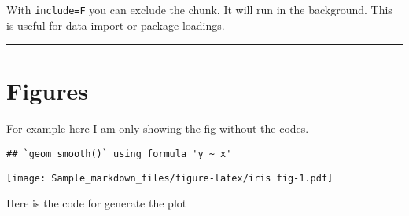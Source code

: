 \documentclass[]{article}
\begin{document}
With \texttt{include=F} you can exclude the chunk. It will run in the
background. This is useful for data import or package loadings.

\begin{center}\rule{0.5\linewidth}{0.5pt}\end{center}

\hypertarget{figures}{%
\section{Figures}\label{figures}}

For example here I am only showing the fig without the codes.

\begin{verbatim}
## `geom_smooth()` using formula 'y ~ x'
\end{verbatim}

\texttt{[image: Sample\_markdown\_files/figure-latex/iris fig-1.pdf]}

Here is the code for generate the plot
\end{document}
